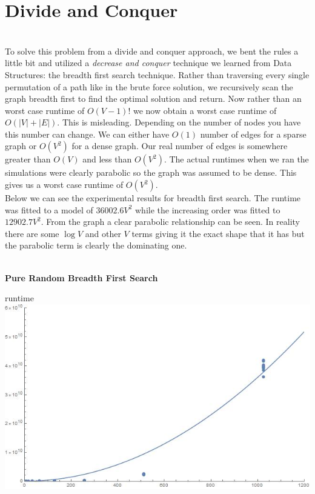 \documentclass[12pt]{report}
\begin{document}
\section*{Divide and Conquer}
\ \\
To solve this problem from a divide and conquer approach, we 
bent the rules a little bit and utilized a \textit{decrease and conquer} 
technique we learned from Data Structures: the breadth first search 
technique. Rather than traversing every single permutation of a path like in 
the brute force solution, we recursively scan the graph breadth first to find
the optimal solution and return. Now rather than an worst 
case runtime of $O(V-1)!$ we now obtain a worst case runtime of $O(|V|+|E|)$.
This is misleading. Depending on the number of nodes you have this number can change.
We can either have $O(1)$ number of edges for a sparse graph or $O(V^2)$ for a
dense graph. Our real number of edges is somewhere greater than $O(V)$ and 
less than $O(V^2)$. The actual runtimes when we ran the simulations were 
clearly parabolic so the graph was assumed to be dense. This gives us a worst
case runtime of $O(V^2)$.
\\
Below we can see the experimental results for breadth first search. The runtime was
fitted to a model of $36002.6 V^2$ while the increasing order was 
fitted to $12902.7V^2$. From the graph a clear parabolic relationship
can be seen. In reality there are some $\log{V}$ and other $V$ terms giving
it the exact shape that it has but the parabolic term is clearly the dominating
one.\\\\
\newpage
\centerline{\textbf{Pure Random Breadth First Search}}
runtime \includegraphics[scale=.5]{pureBFS.jpg}\\
\end{document}
